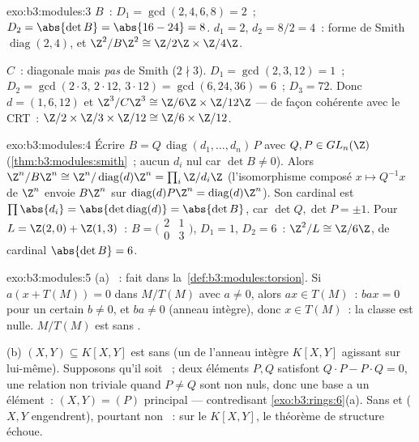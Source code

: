 \begin{solution}{exo:b3:modules:3}
$B$~: $D_1 = \gcd(2,4,6,8) = 2$~; $D_2 = \abs{\det B} = \abs{16 -
24} = 8$.  $d_1 = 2$, $d_2 = 8/2 = 4$~: forme
de Smith $\operatorname{diag}(2, 4)$, et $\Z^2/B\Z^2 \cong
\Z/2\Z \times \Z/4\Z$.

$C$~: diagonale mais \emph{pas} de Smith ($2 \nmid 3$). $D_1 =
\gcd(2,3,12) = 1$~; $D_2 = \gcd(2\cdot3,\, 2\cdot12,\, 3\cdot12)
= \gcd(6, 24, 36) = 6$~; $D_3 = 72$. Donc $d = (1, 6, 12)$ et
$\Z^3/C\Z^3 \cong \Z/6\Z\times\Z/12\Z$ --- de façon cohérente
avec le CRT~: $\Z/2\times\Z/3\times\Z/12 \cong \Z/6\times\Z/12$.
\end{solution}

\begin{solution}{exo:b3:modules:4}
Écrire $B = Q\,\operatorname{diag}(d_1, \dots, d_n)\,P$ avec $Q,
P \in GL_n(\Z)$ (\cref{thm:b3:modules:smith}~; aucun $d_i$ nul
car $\det B \neq 0$). Alors $\Z^n/B\Z^n \cong \Z^n/
\operatorname{diag}(d)\Z^n = \prod_i \Z/d_i\Z$ (l'isomorphisme
composé $x \mapsto Q^{-1}x$ de $\Z^n$ envoie $B\Z^n$ sur
$\operatorname{diag}(d)P\Z^n = \operatorname{diag}(d)\Z^n$). Son
cardinal est $\prod \abs{d_i} = \abs{\det
\operatorname{diag}(d)} = \abs{\det B}$, car $\det Q, \det P =
\pm 1$. Pour $L = \Z(2,0) + \Z(1,3)$~: $B =
\bigl(\begin{smallmatrix}2 & 1\\ 0 & 3\end{smallmatrix}\bigr)$,
$D_1 = 1$, $D_2 = 6$~: $\Z^2/L \cong \Z/6\Z$, de cardinal
$\abs{\det B} = 6$.
\end{solution}

\begin{solution}{exo:b3:modules:5}
(a) ~: fait dans la~\cref{def:b3:modules:torsion}. Si
$a(x + T(M)) = 0$ dans $M/T(M)$ avec $a \neq 0$, alors $ax \in
T(M)$~: $bax = 0$ pour un certain $b \neq 0$, et $ba \neq 0$
(anneau intègre), donc $x \in T(M)$~: la classe est nulle.
$M/T(M)$ est sans .

(b) $(X, Y) \subseteq K[X,Y]$ est sans  (un  de
l'anneau intègre $K[X,Y]$ agissant sur lui-même). Supposons qu'il
soit ~; deux éléments $P, Q$ satisfont $Q\cdot P - P \cdot Q
= 0$, une relation non triviale quand $P \ne Q$ sont non nuls,
donc une base a un élément~: $(X, Y) = (P)$ principal ---
contredisant \cref{exo:b3:rings:6}(a). Sans  et  ($X, Y$ engendrent), pourtant non ~: sur le 
$K[X,Y]$, le théorème de structure échoue.
\end{solution}

